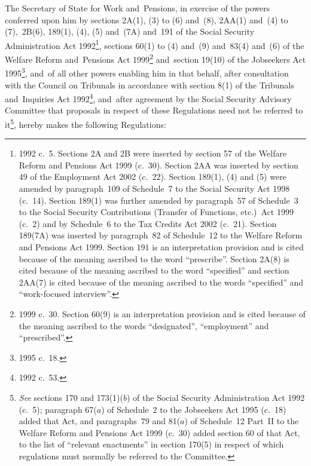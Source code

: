 \documentclass[12pt,a4paper]{article}
\title{\regstitle}
\author{S.I.\ 2004 No.\ 959}
\date{Made
29th March 2004\\
Laid before Parliament
5th April 2004\\
Coming into~force
26th April 2004
}
\begin{document}
\maketitle

\enlargethispage{\baselineskip}

\noindent
The Secretary of State for Work and~Pensions, in exercise of the powers conferred upon him by sections 2A(1), (3) to (6) and~(8), 2AA(1) and~(4) to (7),~2B(6), 189(1), (4), (5) and~(7A) and~191 of the Social Security Administration Act 1992\footnote{1992 c.~5. Sections 2A and 2B were inserted by section 57 of the Welfare Reform and Pensions Act 1999 (c.~30). Section 2AA was inserted by section 49 of the Employment Act 2002 (c.~22). Section 189(1), (4) and (5) were amended by paragraph~109 of Schedule~7 to the Social Security Act 1998 (c.~14). Section 189(1) was further amended by paragraph~57 of Schedule~3 to the Social Security Contributions (Transfer of Functions, etc.)\ Act 1999 (c.~2) and by Schedule~6 to the Tax Credits Act 2002 (c.~21). Section 189(7A) was inserted by paragraph~82 of Schedule~12 to the Welfare Reform and Pensions Act 1999. Section 191 is an interpretation provision and is cited because of the meaning ascribed to the word “prescribe”. Section 2A(8) is cited because of the meaning ascribed to the word “specified” and section 2AA(7) is cited because of the meaning ascribed to the words “specified” and “work-focused interview”.}, sections 60(1) to (4) and~(9) and~83(4) and~(6) of the Welfare Reform and~Pensions Act 1999\footnote{1999 c.~30. Section 60(9) is an interpretation provision and is cited because of the meaning ascribed to the words “designated”, “employment” and “prescribed”.} and~section 19(10) of the Jobseekers Act 1995\footnote{1995 c.~18.}, and~of all other powers enabling him in that behalf, after consultation with the Council on Tribunals in accordance with section 8(1) of the Tribunals and~Inquiries Act 1992\footnote{1992 c.~53.}, and~after agreement by the Social Security Advisory Committee that proposals in respect of these Regulations need not be referred to it\footnote{\emph{See} sections 170 and 173(1)($b$)  of the Social Security Administration Act 1992 (c.~5); paragraph 67($a$)  of Schedule~2 to the Jobseekers Act 1995 (c.~18) added that Act, and paragraphs~79 and 81($a$)  of Schedule~12 Part~II to the Welfare Reform and Pensions Act 1999 (c.~30) added section 60 of that Act, to the list of “relevant enactments” in section 170(5) in respect of which regulations must normally be referred to the Committee.}, hereby makes the following Regulations: 
\end{document}
